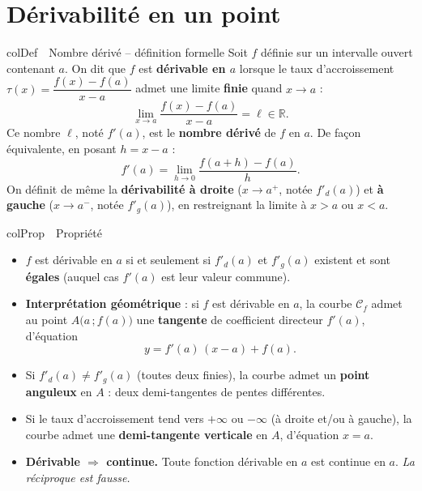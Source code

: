 \documentclass[11pt,a4paper]{article}
\newenvironment{definition}[1][Définition]
  {\begin{fiche}{colDef}{\ding{110}~~#1}}{\end{fiche}}
\newenvironment{propriete}[1][Propriété]
  {\begin{fiche}{colProp}{\ding{72}~~#1}}{\end{fiche}}
\begin{document}
\vspace{4mm}

\section{Dérivabilité en un point}

\begin{definition}[Nombre dérivé -- définition formelle]
Soit $f$ définie sur un intervalle ouvert contenant $a$. On dit que $f$ est \textbf{dérivable en $a$} lorsque le taux d'accroissement $\tau(x) = \dfrac{f(x) - f(a)}{x - a}$ admet une limite \textbf{finie} quand $x \to a$ :
\[
  \lim_{x \to a} \frac{f(x) - f(a)}{x - a} = \ell \in \mathbb{R}.
\]
Ce nombre $\ell$, noté $f'(a)$, est le \textbf{nombre dérivé} de $f$ en $a$. De façon équivalente, en posant $h = x - a$ :
\[
  f'(a) = \lim_{h \to 0} \frac{f(a + h) - f(a)}{h}.
\]
On définit de même la \textbf{dérivabilité à droite} ($x \to a^+$, notée $f'_d(a)$) et \textbf{à gauche} ($x \to a^-$, notée $f'_g(a)$), en restreignant la limite à $x > a$ ou $x < a$.
\end{definition}

\begin{propriete}
\begin{itemize}[leftmargin=6mm, itemsep=0.5mm]
  \item $f$ est dérivable en $a$ si et seulement si $f'_d(a)$ et $f'_g(a)$ existent et sont \textbf{égales} (auquel cas $f'(a)$ est leur valeur commune).
  \item \textbf{Interprétation géométrique} : si $f$ est dérivable en $a$, la courbe $\mathcal{C}_f$ admet au point $A\bigl(a\,;f(a)\bigr)$ une \textbf{tangente} de coefficient directeur $f'(a)$, d'équation
  \[
    y = f'(a)\,(x - a) + f(a).
  \]
  \item Si $f'_d(a) \neq f'_g(a)$ (toutes deux finies), la courbe admet un \textbf{point anguleux} en $A$ : deux demi-tangentes de pentes différentes.
  \item Si le taux d'accroissement tend vers $+\infty$ ou $-\infty$ (à droite et/ou à gauche), la courbe admet une \textbf{demi-tangente verticale} en $A$, d'équation $x = a$.
  \item \textbf{Dérivable $\Rightarrow$ continue.} Toute fonction dérivable en $a$ est continue en $a$. \emph{La réciproque est fausse.}
\end{itemize}
\end{propriete}
\end{document}
